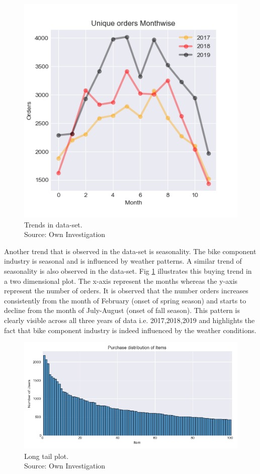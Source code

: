 \begin{figure}
    \centering
    \includegraphics[scale=0.9]{chapters/figures/monthwise_orders.png}
    \caption{Trends in data-set.\\
    Source: Own Investigation}
    \label{fig:season}
\end{figure}
Another trend that is observed in the data-set is seasonality. The bike component industry is seasonal and is influenced by weather patterns. A similar trend of seasonality is also observed in the data-set. Fig \ref{fig:season} illustrates this buying trend in a two dimensional plot. The x-axis represent the months whereas the y-axis represent the number of orders. It is observed that the number orders increases consistently from the month of February (onset of spring season) and starts to decline from the month of July-August (onset of fall season). This pattern is clearly visible across all three years of data i.e. 2017,2018,2019 and highlights the fact that bike component industry is indeed influenced by the weather conditions.



\begin{figure}
    \centering
    \includegraphics[scale=0.7]{chapters/figures/long_tail.png}
    \caption{Long tail plot.\\
    Source: Own Investigation}
    \label{fig:long_tail}
\end{figure}



